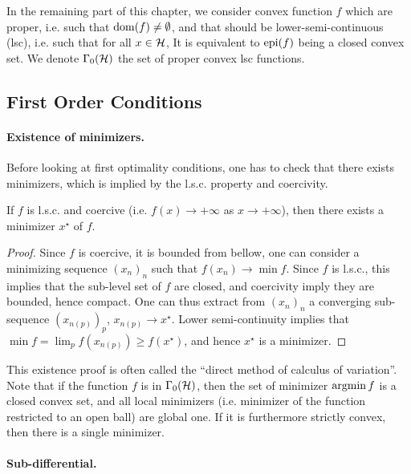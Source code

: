 In the remaining part of this chapter, we consider convex function $f$ which are proper, i.e. such that $\operatorname{dom}(f) \neq \emptyset$, and that should be lower-semi-continuous (lsc), i.e. such that for all $x \in \mathcal{H}$, 
It is equivalent to $\operatorname{epi}(f)$ being a closed convex set.
%
We denote $\Gamma_0(\mathcal{H})$ the set of proper convex lsc functions.

\subsection{First Order Conditions}

\paragraph{Existence of minimizers.}

Before looking at first optimality conditions, one has to check that there exists minimizers, which is implied by the l.s.c. property and coercivity.

\begin{prop}
	If $f$ is l.s.c. and coercive (i.e. $f(x)\rightarrow +\infty$ as $x \rightarrow +\infty$), then there exists a minimizer $x^\star$ of $f$. 
\end{prop}

\begin{proof}
Since $f$ is coercive, it is bounded from bellow, one can consider a minimizing sequence $(x_n)_n$ such that $f(x_n) \rightarrow \min f$. 
%
Since $f$ is l.s.c., this implies that the sub-level set of $f$ are closed, and coercivity imply they are bounded, hence compact. One can thus extract from $(x_n)_n$ a converging sub-sequence $(x_{n(p)})_p$, $x_{n(p)} \rightarrow x^\star$. Lower semi-continuity implies that $\min f = \lim_p f(x_{n(p)}) \geq f(x^\star)$, and hence $x^\star$ is a minimizer.
\end{proof}

This existence proof is often called the ``direct method of calculus of variation''.
%
Note that if the function $f$ is in $\Gamma_0(\mathcal{H})$, then the set of minimizer $\operatorname{argmin} f$ is a closed convex set, and all local minimizers (i.e. minimizer of the function restricted to an open ball) are global one. If it is furthermore strictly convex, then there is a single minimizer. 

\paragraph{Sub-differential.}

